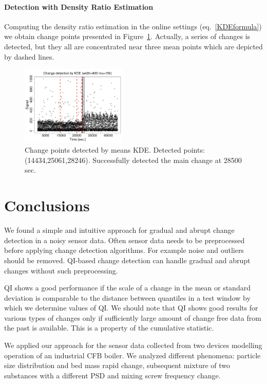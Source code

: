 \paragraph{Detection with Density Ratio Estimation} 
Computing the density ratio estimation in the online settings (eq.~\ref{KDEformula}) we obtain change points presented in Figure~\ref{figure23}.
Actually, a series of changes is detected, but they all are concentrated near three mean points which are depicted by dashed lines.

\begin{figure}[htb!]
\includegraphics[width=0.45\textwidth]{pics/cfb_paper/OMF/OMFkde}
\caption{Change points detected by means KDE. Detected points:(14434,25061,28246). Successfully detected the main change at 28500 sec.} \label{figure23}
\end{figure}

\section{Conclusions}
\label{sec:conclusion}
We found a simple and intuitive approach for gradual and abrupt change detection in a noisy sensor data. 
Often sensor data needs to be preprocessed before applying change detection algorithms. For example noise and outliers should be removed.
QI-based change detection can handle gradual and abrupt changes without such preprocessing.

QI shows a good performance if the scale of a change in the mean or standard deviation
is comparable to the distance between quantiles in a test window by which we determine values of QI. 
We should note that QI shows good results for various types of changes only if sufficiently large amount of change free data from the past is available.
This is a property of the cumulative statistic.

We applied our approach for the sensor data collected from two devices modelling operation of an industrial CFB boiler. 
We analyzed different phenomena: particle size distribution and bed mass rapid change, subsequent mixture of two substances with a different PSD and mixing screw frequency change.

